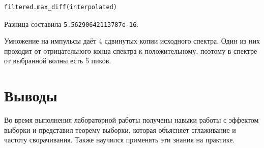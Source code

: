 \documentclass[a4paper,12pt]{report}
\begin{document}
\begin{lstlisting}[caption=Разница между интерполированной волной и фильтрованной волной]
filtered.max_diff(interpolated)
\end{lstlisting}

Разница составила \texttt{5.56290642113787e-16}.

Умножение на импульсы даёт 4 сдвинутых копии исходного спектра. Один из них проходит от отрицательного конца спектра к положительному, поэтому в спектре от выбранной волны есть 5 пиков.

\chapter{Выводы}

Во время выполнения лабораторной работы получены навыки работы с эффектом выборки и представил теорему выборки, которая объясняет сглаживание и частоту сворачивания. Также научился применять эти знания на практике.
\end{document}
